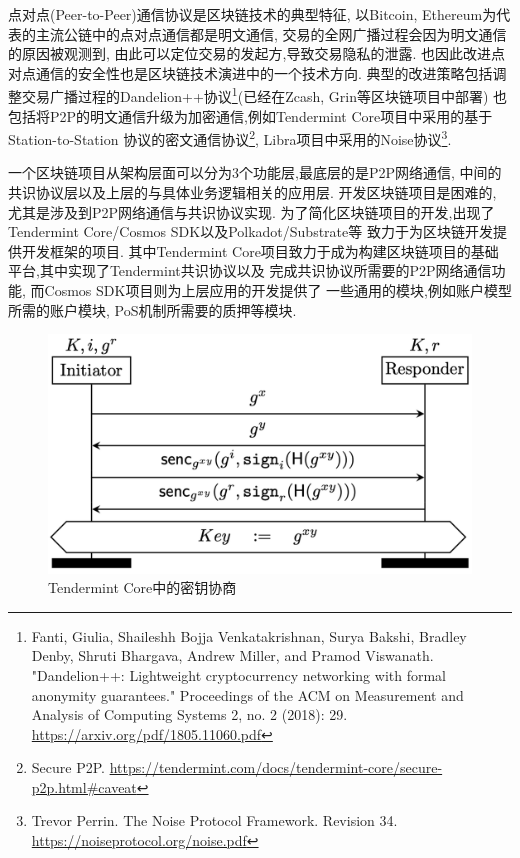 点对点(Peer-to-Peer)通信协议是区块链技术的典型特征,
以Bitcoin, Ethereum为代表的主流公链中的点对点通信都是明文通信,
交易的全网广播过程会因为明文通信的原因被观测到,
由此可以定位交易的发起方,导致交易隐私的泄露.
也因此改进点对点通信的安全性也是区块链技术演进中的一个技术方向.
典型的改进策略包括调整交易广播过程的Dandelion++协议\footnote{
Fanti, Giulia, Shaileshh Bojja Venkatakrishnan, Surya Bakshi, Bradley Denby, Shruti Bhargava, Andrew Miller, and Pramod Viswanath. "Dandelion++: Lightweight cryptocurrency networking with formal anonymity guarantees." Proceedings of the ACM on Measurement and Analysis of Computing Systems 2, no. 2 (2018): 29.
\url{https://arxiv.org/pdf/1805.11060.pdf}}(已经在Zcash, Grin等区块链项目中部署)
也包括将P2P的明文通信升级为加密通信,例如Tendermint Core项目中采用的基于Station-to-Station
协议的密文通信协议\footnote{
Secure P2P. \url{https://tendermint.com/docs/tendermint-core/secure-p2p.html\#caveat}},
Libra项目中采用的Noise协议\footnote{
Trevor Perrin. The Noise Protocol Framework. Revision 34.
\url{https://noiseprotocol.org/noise.pdf}}.

一个区块链项目从架构层面可以分为3个功能层,最底层的是P2P网络通信,
中间的共识协议层以及上层的与具体业务逻辑相关的应用层.
开发区块链项目是困难的, 尤其是涉及到P2P网络通信与共识协议实现.
为了简化区块链项目的开发,出现了Tendermint Core/Cosmos SDK以及Polkadot/Substrate等
致力于为区块链开发提供开发框架的项目.
其中Tendermint Core项目致力于成为构建区块链项目的基础平台,其中实现了Tendermint共识协议以及
完成共识协议所需要的P2P网络通信功能, 而Cosmos SDK项目则为上层应用的开发提供了
一些通用的模块,例如账户模型所需的账户模块, PoS机制所需要的质押等模块.

\begin{figure}[h]
\centering
\includegraphics[width=.6\textwidth]{tendermint-handshake.png}
\caption{Tendermint Core中的密钥协商\label{fig-tendermint-handshake}}
\end{figure}

